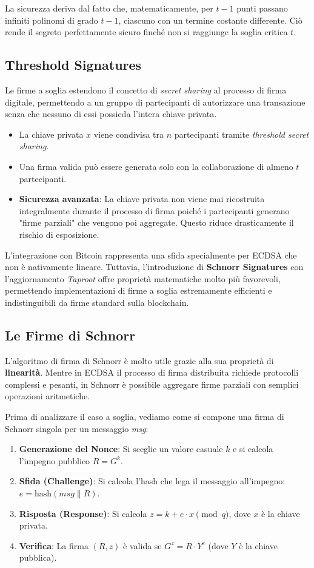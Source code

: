 La sicurezza deriva dal fatto che, matematicamente, per $t-1$ punti passano infiniti polinomi di grado $t-1$, ciascuno con un termine costante differente. Ciò rende il segreto perfettamente sicuro finché non si raggiunge la soglia critica $t$.

\subsection{Threshold Signatures}
Le firme a soglia estendono il concetto di \textit{secret sharing} al processo di firma digitale, permettendo a un gruppo di partecipanti di autorizzare una transazione senza che nessuno di essi possieda l'intera chiave privata.

\begin{itemize}
    \item La chiave privata $x$ viene condivisa tra $n$ partecipanti tramite \textit{threshold secret sharing}.
    \item Una firma valida può essere generata solo con la collaborazione di almeno $t$ partecipanti.
    \item \textbf{Sicurezza avanzata}: La chiave privata non viene mai ricostruita integralmente durante il processo di firma poiché i partecipanti generano "firme parziali" che vengono poi aggregate. Questo riduce drasticamente il rischio di esposizione.
\end{itemize}

L'integrazione con Bitcoin rappresenta una sfida specialmente per ECDSA che non è nativamente lineare. Tuttavia, l'introduzione di \textbf{Schnorr Signatures} con l'aggiornamento \textit{Taproot} offre proprietà matematiche molto più favorevoli, permettendo implementazioni di firme a soglia estremamente efficienti e indistinguibili da firme standard sulla blockchain.

\subsection*{Le Firme di Schnorr}
L'algoritmo di firma di Schnorr è molto utile grazie alla sua proprietà di \textbf{linearità}. Mentre in ECDSA il processo di firma distribuita richiede protocolli complessi e pesanti, in Schnorr è possibile aggregare firme parziali con semplici operazioni aritmetiche.

Prima di analizzare il caso a soglia, vediamo come si compone una firma di Schnorr singola per un messaggio \textit{msg}:
\begin{enumerate}
    \item \textbf{Generazione del Nonce}: Si sceglie un valore casuale $k$ e si calcola l'impegno pubblico $R = G^k$.
    \item \textbf{Sfida (Challenge)}: Si calcola l'hash che lega il messaggio all'impegno: $e = \text{hash}(msg \parallel R)$.
    \item \textbf{Risposta (Response)}: Si calcola $z = k + e \cdot x \pmod q$, dove $x$ è la chiave privata.
    \item \textbf{Verifica}: La firma $(R, z)$ è valida se $G^z = R \cdot Y^e$ (dove $Y$ è la chiave pubblica).
\end{enumerate}

